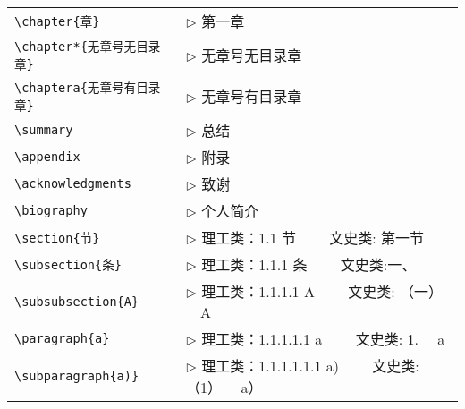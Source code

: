 \begin{tabular}{ll}
  \verb|\chapter{章}|              & $\triangleright$ 第一章 \\
  \verb|\chapter*{无章号无目录章}|       & $\triangleright$ 无章号无目录章 \\
  \verb|\chaptera{无章号有目录章}|   & $\triangleright$ 无章号有目录章 \\
  \verb|\summary|                  & $\triangleright$ 总结\\
  \verb|\appendix|                 & $\triangleright$ 附录\\
  \verb|\acknowledgments|          & $\triangleright$ 致谢\\
  \verb|\biography|                & $\triangleright$ 个人简介\\
  \verb|\section{节}|              & $\triangleright$ 理工类：1.1 节 ~~~~文史类: 第一节 \\
  \verb|\subsection{条}|           & $\triangleright$ 理工类：1.1.1 条 ~~~~文史类:一、\\
  \verb|\subsubsection{A}|         & $\triangleright$ 理工类：1.1.1.1 A  ~~~~文史类: （一） ~~A\\
  \verb|\paragraph{a}|             & $\triangleright$ 理工类：1.1.1.1.1 a  ~~~~文史类: 1. ~~a\\
  \verb|\subparagraph{a)}|         & $\triangleright$ 理工类：1.1.1.1.1.1 a)  ~~~~文史类: （1） ~~a）\\
\end{tabular}

